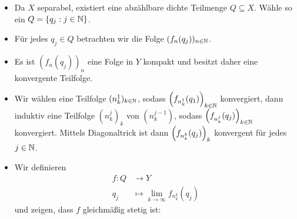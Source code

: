 \begin{beweis}
	\begin{itemize}
		\item Da $X$ separabel, existiert eine abzählbare dichte Teilmenge $Q \subseteq X$.
		Wähle so ein $Q = \{q_j : j \in \NN\}$.
		\item Für jedes $q_j \in Q$ betrachten wir die Folge $(f_n(q_j))_{n \in \NN}$.
		\item Es ist $(f_n(q_j))_n$ eine Folge in $Y$ kompakt und besitzt daher eine konvergente Teilfolge.
		\item Wir wählen eine Teilfolge $(n_k^1)_{k \in \NN}$, sodass $\enbrace*{f_{n_k^1}(q_1)}_{k \in \NN}$ konvergiert, dann induktiv eine Teilfolge $(n_k^j)_k$ von $(n_k^{j-1})$, sodass $\enbrace*{f_{n_k^j}(q_j)}_{k \in \NN}$ konvergiert.
		Mittels Diagonaltrick ist dann $\enbrace*{f_{n_k^k}(q_j)}_k$ konvergent für jedes $j \in \NN$.
		\item Wir definieren 
		\begin{align*}
			f \colon Q &\longrightarrow Y \\
			q_j &\longmapsto \lim\limits_{k \rightarrow \infty} f_{n_k^k}(q_j)
		\end{align*}
		und zeigen, dass $f$ gleichmäßig stetig ist:
		

\end{itemize}
\end{beweis}
